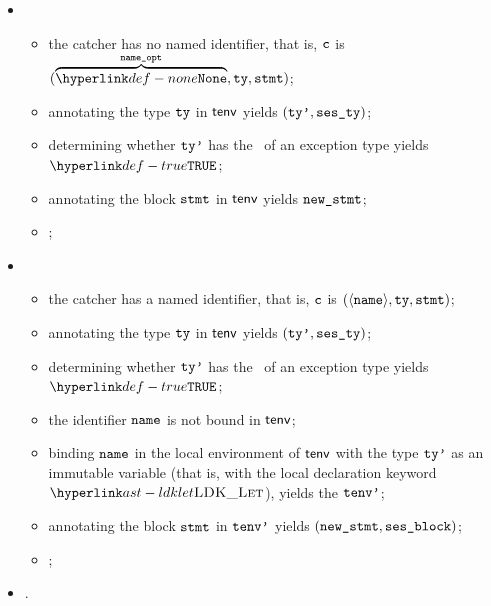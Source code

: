 \ProseParagraph
\OneApplies
\begin{itemize}
  \item {}
  \begin{itemize}
    \item the catcher has no named identifier, that is, $\texttt{c}$ is $(\overname{\None}{\nameopt}, \tty, \vstmt)$;
    \item annotating the type $\texttt{ty}$ in $\textsf{tenv}$ yields $(\texttt{ty'}, \texttt{ses\_ty})$\ProseOrTypeError;
    \item determining whether $\texttt{ty'}$ has the \structure\ of an exception type yields \\ $\True$\ProseOrTypeError;
    \item annotating the block $\texttt{stmt}$ in $\textsf{tenv}$ yields $\texttt{new\_stmt}$;
    \item \Proseeqdef{$\newcatcher$}{$(\overname{\None}{\nameopt}, \ttyp, \newstmt)$};
  \end{itemize}

  \item {}
  \begin{itemize}
    \item the catcher has a named identifier, that is, $\texttt{c}$ is $(\langle\texttt{name}\rangle, \texttt{ty}, \texttt{stmt})$;
    \item annotating the type $\texttt{ty}$ in $\textsf{tenv}$ yields $(\texttt{ty'}, \texttt{ses\_ty})$\ProseOrTypeError;
    \item determining whether $\texttt{ty'}$ has the \structure\ of an exception type yields \\ $\True$\ProseOrTypeError;
    \item the identifier $\texttt{name}$ is not bound in $\textsf{tenv}$;
    \item binding $\texttt{name}$ in the local environment of $\textsf{tenv}$ with the type $\texttt{ty'}$ as an immutable variable
          (that is, with the local declaration keyword $\LDKLet$), yields the \staticenvironmentterm{} $\texttt{tenv'}$;
    \item annotating the block $\texttt{stmt}$ in $\texttt{tenv'}$ yields $(\texttt{new\_stmt}, \texttt{ses\_block})$;
    \item \Proseeqdef{$\newcatcher$}{$(\overname{\langle\name\rangle}{\nameopt}, \ttyp, \newstmt)$};
  \end{itemize}
  \item {}.
\end{itemize}

